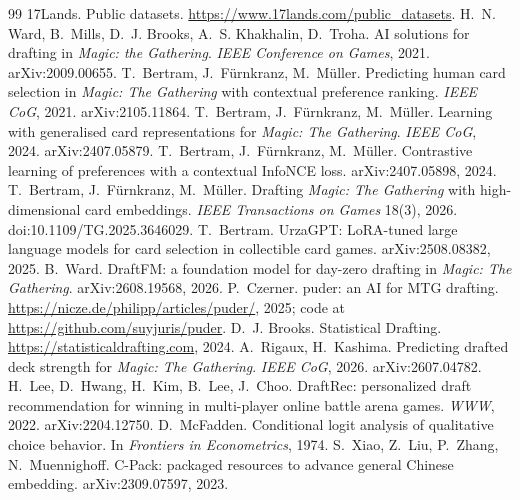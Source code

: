 \documentclass[10pt,letterpaper]{article}
\begin{document}
\small
\begin{thebibliography}{99}\setlength{\itemsep}{1pt}
 17Lands. Public datasets. \url{https://www.17lands.com/public_datasets}.
 H.~N. Ward, B.~Mills, D.~J. Brooks, A.~S. Khakhalin, D.~Troha. AI solutions for drafting in
\emph{Magic: the Gathering}. \emph{IEEE Conference on Games}, 2021. arXiv:2009.00655.
 T.~Bertram, J.~F\"urnkranz, M.~M\"uller. Predicting human card selection in
\emph{Magic: The Gathering} with contextual preference ranking. \emph{IEEE CoG}, 2021. arXiv:2105.11864.
 T.~Bertram, J.~F\"urnkranz, M.~M\"uller. Learning with generalised card
representations for \emph{Magic: The Gathering}. \emph{IEEE CoG}, 2024. arXiv:2407.05879.
 T.~Bertram, J.~F\"urnkranz, M.~M\"uller. Contrastive learning of preferences
with a contextual InfoNCE loss. arXiv:2407.05898, 2024.
 T.~Bertram, J.~F\"urnkranz, M.~M\"uller. Drafting \emph{Magic: The Gathering} with
high-dimensional card embeddings. \emph{IEEE Transactions on Games} 18(3), 2026. doi:10.1109/TG.2025.3646029.
 T.~Bertram. UrzaGPT: LoRA-tuned large language models for card selection in collectible card
games. arXiv:2508.08382, 2025.
 B.~Ward. DraftFM: a foundation model for day-zero drafting in \emph{Magic: The Gathering}.
arXiv:2608.19568, 2026.
 P.~Czerner. puder: an AI for MTG drafting. \url{https://nicze.de/philipp/articles/puder/}, 2025;
code at \url{https://github.com/suyjuris/puder}.
 D.~J. Brooks. Statistical Drafting. \url{https://statisticaldrafting.com}, 2024.
 A.~Rigaux, H.~Kashima. Predicting drafted deck strength for \emph{Magic: The
Gathering}. \emph{IEEE CoG}, 2026. arXiv:2607.04782.
 H.~Lee, D.~Hwang, H.~Kim, B.~Lee, J.~Choo. DraftRec: personalized draft recommendation for
winning in multi-player online battle arena games. \emph{WWW}, 2022. arXiv:2204.12750.
 D.~McFadden. Conditional logit analysis of qualitative choice behavior. In \emph{Frontiers
in Econometrics}, 1974.
 S.~Xiao, Z.~Liu, P.~Zhang, N.~Muennighoff. C-Pack: packaged resources to advance general Chinese
embedding. arXiv:2309.07597, 2023.
\end{thebibliography}
\end{document}
